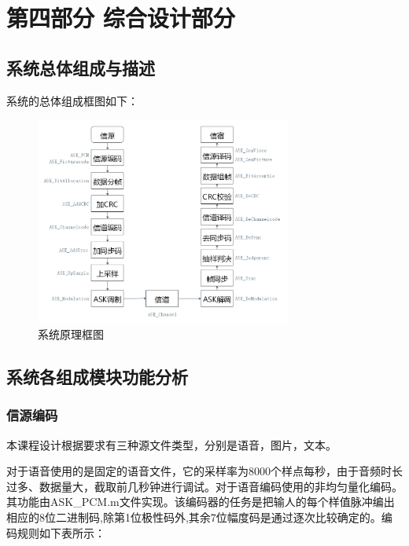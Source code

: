 \documentclass[UTF8]{ctexart}
\begin{document}
\newpage

\section{第四部分 \texorpdfstring{\quad}{} 综合设计部分}

\subsection{系统总体组成与描述}

系统的总体组成框图如下：

\begin{figure}[H]
    \centering
    
    \includegraphics[width=0.75\textwidth]{pics/3.png}
    \caption{系统原理框图}\label{fig:3}

\end{figure}

\subsection{系统各组成模块功能分析}

\subsubsection{信源编码}

本课程设计根据要求有三种源文件类型，分别是语音，图片，文本。

对于语音使用的是固定的语音文件，它的采样率为8000个样点每秒，由于音频时长过多、数据量大，截取前几秒钟进行调试。对于语音编码使用的非均匀量化编码。其功能由ASK\_PCM.m文件实现。该编码器的任务是把输人的每个样值脉冲编出相应的8位二进制码,除第1位极性码外,其余7位幅度码是通过逐次比较确定的。编码规则如下表所示：
\end{document}

